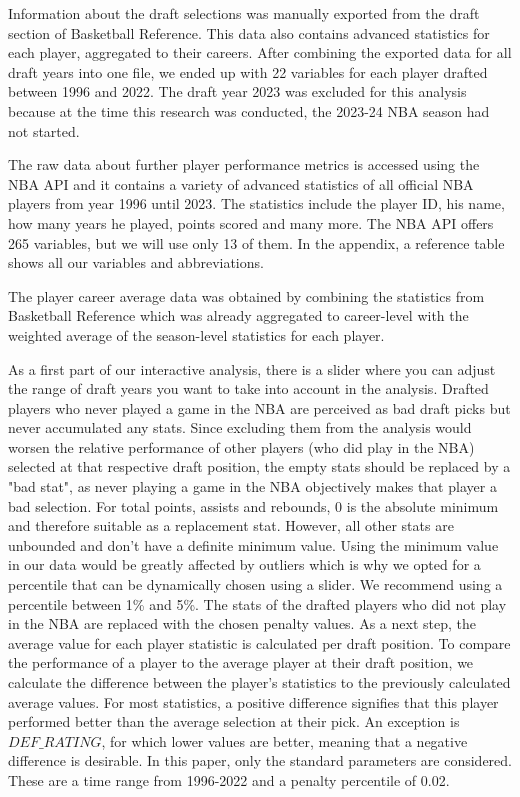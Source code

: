 \documentclass[12pt]{article}
\begin{document}
Information about the draft selections was manually exported from the draft section of Basketball Reference. This data also contains advanced statistics for each player, aggregated to their careers. After combining the exported data for all draft years into one file, we ended up with 22 variables for each player drafted between 1996 and 2022. The draft year 2023 was excluded for this analysis because at the time this research was conducted, the 2023-24 NBA season had not started.

The raw data about further player performance metrics is accessed using the NBA API and it contains a variety of advanced statistics of all official NBA players from year 1996 until 2023. The statistics include the player ID, his name, how many years he played, points scored and many more. The NBA API offers 265 variables, but we will use only 13 of them. In the appendix, a reference table shows all our variables and abbreviations.

The player career average data was obtained by combining the statistics from Basketball Reference which was already aggregated to career-level with the weighted average of the season-level statistics for each player.

As a first part of our interactive analysis, there is a slider where you can adjust the range of draft years you want to take into account in the analysis. Drafted players who never played a game in the NBA are perceived as bad draft picks but never accumulated any stats. Since excluding them from the analysis would worsen the relative performance of other players (who did play in the NBA) selected at that respective draft position, the empty stats should be replaced by a "bad stat", as never playing a game in the NBA objectively makes that player a bad selection. For total points, assists and rebounds, 0 is the absolute minimum and therefore suitable as a replacement stat. However, all other stats are unbounded and don't have a definite minimum value. Using the minimum value in our data would be greatly affected by outliers which is why we opted for a percentile that can be dynamically chosen using a slider. We recommend using a percentile between 1\% and 5\%. The stats of the drafted players who did not play in the NBA are replaced with the chosen penalty values. As a next step, the average value for each player statistic is calculated per draft position. To compare the performance of a player to the average player at their draft position, we calculate the difference between the player's statistics to the previously calculated average values. For most statistics, a positive difference signifies that this player performed better than the average selection at their pick. An exception is $DEF\_RATING$, for which lower values are better, meaning that a negative difference is desirable. In this paper, only the standard parameters are considered. These are a time range from 1996-2022 and a penalty percentile of 0.02. 
\end{document}

